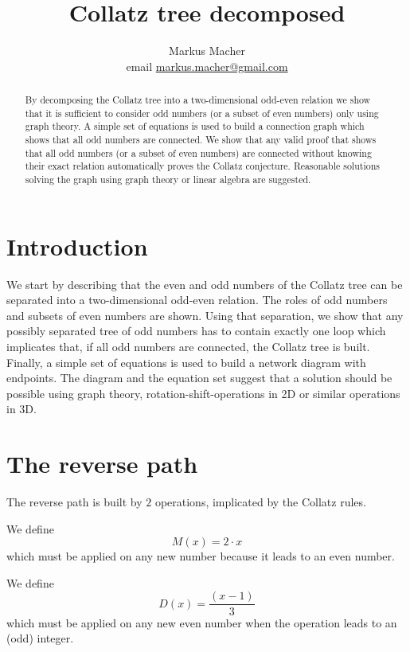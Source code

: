 \documentclass[10pt,a4paper]{article}
\title{Collatz tree decomposed}
\author{Markus Macher \\ email \href{mailto:markus.macher@gmail.com}{markus.macher@gmail.com}}
\begin{document}
\renewcommand{\abstractname}{Abstract}
\begin{abstract}
By decomposing the Collatz tree into a two-dimensional odd-even relation we show that it is sufficient to consider odd numbers (or a subset of even numbers) only using graph theory. A simple set of equations is used to build a connection graph which shows that all odd numbers are connected. We show that any valid proof that shows that all odd numbers (or a subset of even numbers) are connected without knowing their exact relation automatically proves the Collatz conjecture. Reasonable solutions solving the graph using graph theory or linear algebra are suggested.
\end{abstract}
\noindent
\bigskip\bigskip\bigskip
\noindent
{}

\section{Introduction}
We start by describing that the even and odd numbers of the Collatz tree can be separated into a two-dimensional odd-even relation. The roles of odd numbers and subsets of even numbers are shown. Using that separation, we show that any possibly separated tree of odd numbers has to contain exactly one loop which implicates that, if all odd numbers are connected, the Collatz tree is built.
Finally, a simple set of equations is used to build a network diagram with endpoints. The diagram and the equation set suggest that a solution should be possible using graph theory, rotation-shift-operations in 2D or similar operations in 3D.
\section{The reverse path}
The reverse path is built by $2$ operations, implicated by the Collatz rules.

We define
\begin{equation}
M(x)=2\cdot x
\end{equation}
which must be applied on any new number because it leads to an even number.

We define
\begin{equation}
D(x)=\frac{(x-1)}{3}
\end{equation}
which must be applied on any new even number when the operation leads to an (odd) integer.
\end{document}

